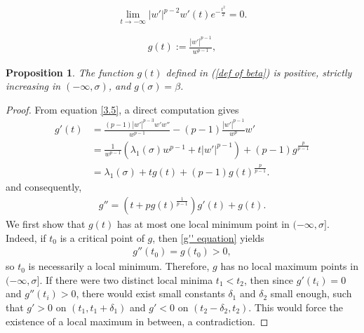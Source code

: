 \documentclass[10pt,a4paper]{amsart}
\newtheorem{proposition}{Proposition}
\begin{document}
\begin{equation}\label{3.6}
\lim\limits_{t\rightarrow -\infty}|w'|^{p-2}w'(t)e^{-\frac{t^2}{2}}=0.
\end{equation}

\begin{align}\label{def of beta}
   g(t):=\frac{|w'|^{p-1}}{w^{p-1}},
\end{align}

\begin{proposition}\label{monotone of beta prop}
    The function $g(t)$ defined in (\ref{def of beta}) is positive, strictly increasing in $(-\infty,\sigma)$,
and $g(\sigma) = \beta$.
\end{proposition}

\begin{proof} 
From equation \eqref{3.5},
a direct computation gives
\begin{align}\label{3.10}
    g'(t)&=\frac{(p-1)|w'|^{p-3}w'w''}{w^{p-1}}-(p-1)\frac{|w'|^{p-1}}{w^{p}}w'\nonumber\\
    &=\frac{1}{w^{p-1}}(\lambda_1(\sigma) w^{p-1}+t|w'|^{p-1})+(p-1)g^{\frac{p}{p-1}}\nonumber\\
    &=\lambda_1(\sigma) +tg(t)+(p-1)g(t)^{\frac{p}{p-1}}.
\end{align}
and consequently,
\begin{align}\label{g'' equation}
    g''=(t+pg(t)^{\frac{1}{p-1}})g'(t)+g(t).
\end{align}
We first show that $g(t)$ has at most one local minimum point in 
$(-\infty,\sigma]$.   Indeed, if  $t_{0}$ is a critical point of $g$, then \eqref{g'' equation} yields
\begin{align*}
    g''(t_{0})=g(t_{0})>0,
\end{align*}
so $t_{0}$ is necessarily a local minimum. Therefore,  $g$ has no local maximum points in $(-\infty,\sigma]$. If there were  two distinct local minima  $t_1< t_2$, then since $g'(t_i)=0$ and
$g''(t_i)>0$,  there would exist small 
 constants $\delta_1$ and $\delta_2$ small enough, such that $g'>0$ on  $ (t_{1}, t_{1}+\delta_1)$ and $g'<0$ on  $(t_{2}-\delta_2, t_{2})$. This would force the existence of a local  maximum  in between, a contradiction.


\end{proof}
\end{document}
